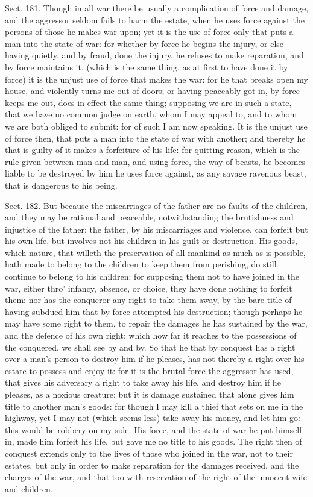 \documentclass[11pt,openany]{book}
\begin{document}
Sect. 181. Though in all war there be usually a complication of force and damage, and the aggressor seldom fails to harm the estate, when he uses force against the persons of those he makes war upon; yet it is the use of force only that puts a man into the state of war: for whether by force he begins the injury, or else having quietly, and by fraud, done the injury, he refuses to make reparation, and by force maintains it, (which is the same thing, as at first to have done it by force) it is the unjust use of force that makes the war: for he that breaks open my house, and violently turns me out of doors; or having peaceably got in, by force keeps me out, does in effect the same thing; supposing we are in such a state, that we have no common judge on earth, whom I may appeal to, and to whom we are both obliged to submit: for of such I am now speaking. It is the unjust use of force then, that puts a man into the state of war with another; and thereby he that is guilty of it makes a forfeiture of his life: for quitting reason, which is the rule given between man and man, and using force, the way of beasts, he becomes liable to be destroyed by him he uses force against, as any savage ravenous beast, that is dangerous to his being.

Sect. 182. But because the miscarriages of the father are no faults of the children, and they may be rational and peaceable, notwithstanding the brutishness and injustice of the father; the father, by his miscarriages and violence, can forfeit but his own life, but involves not his children in his guilt or destruction. His goods, which nature, that willeth the preservation of all mankind as much as is possible, hath made to belong to the children to keep them from perishing, do still continue to belong to his children: for supposing them not to have joined in the war, either thro' infancy, absence, or choice, they have done nothing to forfeit them: nor has the conqueror any right to take them away, by the bare title of having subdued him that by force attempted his destruction; though perhaps he may have some right to them, to repair the damages he has sustained by the war, and the defence of his own right; which how far it reaches to the possessions of the conquered, we shall see by and by. So that he that by conquest has a right over a man's person to destroy him if he pleases, has not thereby a right over his estate to possess and enjoy it: for it is the brutal force the aggressor has used, that gives his adversary a right to take away his life, and destroy him if he pleases, as a noxious creature; but it is damage sustained that alone gives him title to another man's goods: for though I may kill a thief that sets on me in the highway, yet I may not (which seems less) take away his money, and let him go: this would be robbery on my side. His force, and the state of war he put himself in, made him forfeit his life, but gave me no title to his goods. The right then of conquest extends only to the lives of those who joined in the war, not to their estates, but only in order to make reparation for the damages received, and the charges of the war, and that too with reservation of the right of the innocent wife and children.
\end{document}
